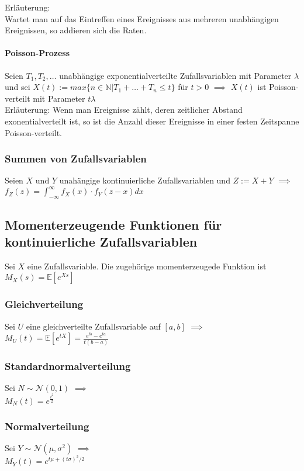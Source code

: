 \documentclass[a4paper,9pt]{extarticle}
\begin{document}
Erläuterung: \\
Wartet man auf das Eintreffen eines Ereignisses aus mehreren unabhängigen Ereignissen, so addieren sich die Raten.

\paragraph*{Poisson-Prozess}
Seien $T_1, T_2, \dots$ unabhängige exponentialverteilte Zufallsvariablen mit Parameter $\lambda$ und sei $X(t) := max\{n \in \mathbb{N} | T_1 + \dots + T_n ≤ t\}$ für $t > 0$ $\implies$ $X(t)$ ist Poisson-verteilt mit Parameter $t\lambda$ \\

Erläuterung:
Wenn man Ereignisse zählt, deren zeitlicher Abstand exonentialverteilt ist, so ist die Anzahl dieser Ereignisse in einer festen Zeitspanne Poisson-verteilt.

\subsubsection*{Summen von Zufallsvariablen}
Seien $X$ und $Y$ unahängige kontinuierliche Zufallsvariablen und $Z := X + Y$ $\implies$ \\
$f_Z(z) = \int_{-∞}^∞ f_X(x) ⋅ f_Y(z - x) dx$

\subsection*{Momenterzeugende Funktionen für kontinuierliche Zufallsvariablen}
Sei $X$ eine Zufallsvariable. Die zugehörige momenterzeugede Funktion ist \\
$M_X(s) = \mathbb{E}[e^{Xs}]$

\subsubsection*{Gleichverteilung}
Sei $U$ eine gleichverteilte Zufallsvariable auf $[a,b]$ $\implies$ \\
$M_U (t) = \mathbb{E}[e^{tX}] = \frac{e^{tb} - e^{ta}}{t(b-a)}$

\subsubsection*{Standardnormalverteilung}
Sei $N \sim \mathcal{N}(0,1)$ $\implies$ \\
$M_N(t) = e^{\frac{t^2}{2}}$

\subsubsection*{Normalverteilung}
Sei $Y \sim \mathcal{N}(\mu, \sigma^2)$ $\implies$ \\
$M_Y(t) = e^{t\mu + (t\sigma)^2/2}$
\end{document}
